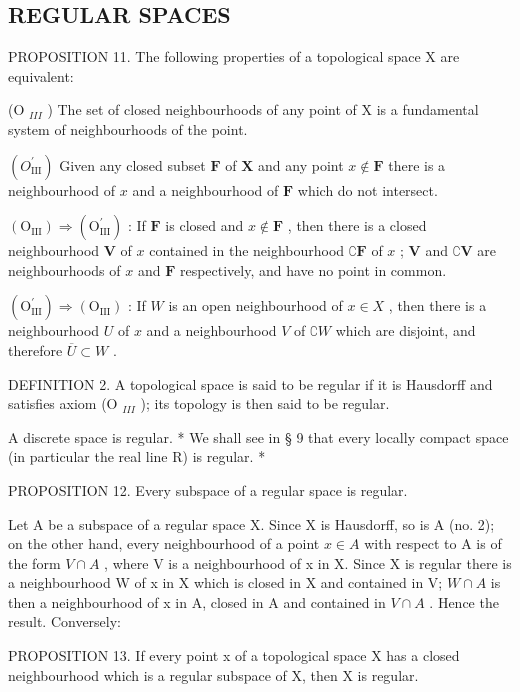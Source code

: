 \subsection{REGULAR SPACES}

PROPOSITION 11. The following properties of a topological space X are equivalent:

(O \(_{III}\) ) The set of closed neighbourhoods of any point of X is a fundamental system of neighbourhoods of the point.

\((O_{\mathrm{III}}^{\prime})\) Given any closed subset \(\mathbf{F}\) of \(\mathbf{X}\) and any point \(x \notin \mathbf{F}\) there is a neighbourhood of \(x\) and a neighbourhood of \(\mathbf{F}\) which do not intersect.

\((\mathrm{O}_{\mathrm{III}}) \Longrightarrow (\mathrm{O}_{\mathrm{III}}^{\prime})\) : If \(\mathbf{F}\) is closed and \(x \notin \mathbf{F}\) , then there is a closed neighbourhood \(\mathbf{V}\) of \(x\) contained in the neighbourhood \(\complement \mathbf{F}\) of \(x\) ; \(\mathbf{V}\) and \(\complement \mathbf{V}\) are neighbourhoods of \(x\) and \(\mathbf{F}\) respectively, and have no point in common.

\((\mathrm{O}_{\mathrm{III}}^{\prime}) \Longrightarrow (\mathrm{O}_{\mathrm{III}})\) : If \(W\) is an open neighbourhood of \(x \in X\) , then there is a neighbourhood \(U\) of \(x\) and a neighbourhood \(V\) of \(\complement W\) which are disjoint, and therefore \(\overline{U} \subset W\) .

DEFINITION 2. A topological space is said to be regular if it is Hausdorff and satisfies axiom (O \(_{III}\) ); its topology is then said to be regular.

A discrete space is regular. * We shall see in § 9 that every locally compact space (in particular the real line R) is regular. *

PROPOSITION 12. Every subspace of a regular space is regular.

Let A be a subspace of a regular space X. Since X is Hausdorff, so is A (no. 2); on the other hand, every neighbourhood of a point \(x \in A\) with respect to A is of the form \(V \cap A\) , where V is a neighbourhood of x in X. Since X is regular there is a neighbourhood W of x in X which is closed in X and contained in V; \(W \cap A\) is then a neighbourhood of x in A, closed in A and contained in \(V \cap A\) . Hence the result. Conversely:

PROPOSITION 13. If every point x of a topological space X has a closed neighbourhood which is a regular subspace of X, then X is regular.

